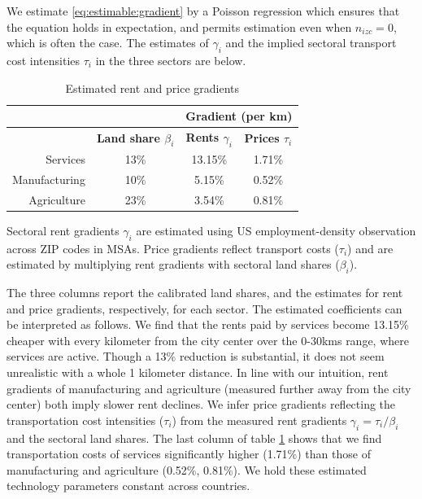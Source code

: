\documentclass[12pt]{article}
\begin{document}
We estimate \eqref{eq:estimable:gradient} by a Poisson regression which ensures that the equation holds in expectation, and permits estimation even when $n_{izc}=0$, which is often the case. The estimates of $\gamma_i$ and the implied sectoral transport cost intensities $\tau_i$ in the three sectors are below.

\begin{table}[h!]
  \begin{center}
  \caption{Estimated rent and price gradients}
    \begin{tabular}{rccc}
    \toprule
    \textbf{} & \textbf{} & \multicolumn{2}{c}{\textbf{Gradient (per km)}}\\
    \midrule
    \textbf{} & \textbf{Land share $\beta_i$ } & \textbf{Rents $\gamma_i$} & \textbf{Prices $\tau_i$} \\
    Services & 13\%  & 13.15\% & 1.71\% \\
    Manufacturing & 10\%  & 5.15\% & 0.52\% \\
    Agriculture & 23\%  & 3.54\% & 0.81\% \\
    \bottomrule
    \end{tabular}%

  \end{center}
  \label{tab:EmpGrad}%

  \noindent \footnotesize{Sectoral rent gradients $\gamma_i$ are estimated using US employment-density observation across ZIP codes in MSAs. Price gradients reflect transport costs ($\tau_i$) and are estimated by multiplying rent gradients with sectoral land shares ($\beta_i$). }
\end{table}%

The three columns report the calibrated land shares, and the estimates for rent and price gradients, respectively, for each sector. The estimated coefficients can be interpreted as follows. We find that the rents paid by services become 13.15\% cheaper with every kilometer from the city center over the 0-30kms range, where services are active. Though a 13\% reduction is substantial, it does not seem unrealistic with a whole 1 kilometer distance. In line with our intuition, rent gradients of manufacturing and agriculture (measured further away from the city center) both imply slower rent declines. We infer price gradients reflecting the transportation cost intensities ($\tau_i$) from the measured rent gradients $\gamma_i=\tau_i/\beta_i$ and the sectoral land shares. The last column of table \ref{tab:EmpGrad} shows that we find transportation costs of services significantly higher (1.71\%) than those of manufacturing and agriculture (0.52\%, 0.81\%). We hold these estimated technology parameters constant across countries. %
\end{document}
